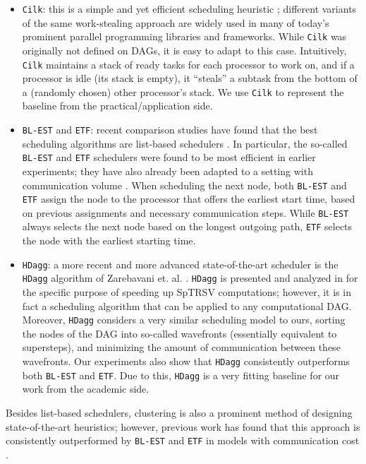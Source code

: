 \documentclass[sigconf,nonacm]{acmart}
\begin{document}
\begin{itemize}[topsep=3pt,itemsep=0pt,partopsep=2pt,parsep=6pt]
 \item \texttt{Cilk}: this is a simple and yet efficient scheduling heuristic \cite{cilk}; different variants of the same work-stealing approach are widely used in many of today's prominent parallel programming libraries and frameworks. While \texttt{Cilk} was originally not defined on DAGs, it is easy to adapt to this case. Intuitively, \texttt{Cilk}  maintains a stack of ready tasks for each processor to work on, and if a processor is idle (its stack is empty), it ``steals'' a subtask from the bottom of a (randomly chosen) other processor's stack.  We use \texttt{Cilk} to represent the baseline from the practical/application side.
 \item \texttt{BL-EST} and \texttt{ETF}: recent comparison studies have found that the best scheduling algorithms are list-based schedulers \cite{schedsurvey, SPD}. In particular, the so-called \texttt{BL-EST} and \texttt{ETF} schedulers were found to be most efficient in earlier experiments; they have also already been adapted to a setting with communication volume \cite{SPD}. When scheduling the next node, both \texttt{BL-EST} and \texttt{ETF} assign the node to the processor that offers the earliest start time, based on previous assignments and necessary communication steps. While \texttt{BL-EST} always selects the next node based on the longest outgoing path, \texttt{ETF} selects the node with the earliest starting time.
 \item \texttt{HDagg}: a more recent and more advanced state-of-the-art scheduler is the \texttt{HDagg} algorithm of Zarebavani et. al. \cite{hdagg}. \texttt{HDagg} is presented and analyzed in \cite{hdagg} for the specific purpose of speeding up SpTRSV computations; however, it is in fact a scheduling algorithm that can be applied to any computational DAG. Moreover, \texttt{HDagg} considers a very similar scheduling model to ours, sorting the nodes of the DAG into so-called wavefronts (essentially equivalent to supersteps), and minimizing the amount of communication between these wavefronts. Our experiments also show that \texttt{HDagg} consistently outperforms both \texttt{BL-EST} and \texttt{ETF}. Due to this, \texttt{HDagg} is a very fitting baseline for our work from the academic side.
\end{itemize}

Besides list-based schedulers, clustering is also a prominent method of designing state-of-the-art heuristics; however, previous work has found that this approach is consistently outperformed by \texttt{BL-EST} and \texttt{ETF} in models with communication cost \cite{SPD}.
\end{document}

